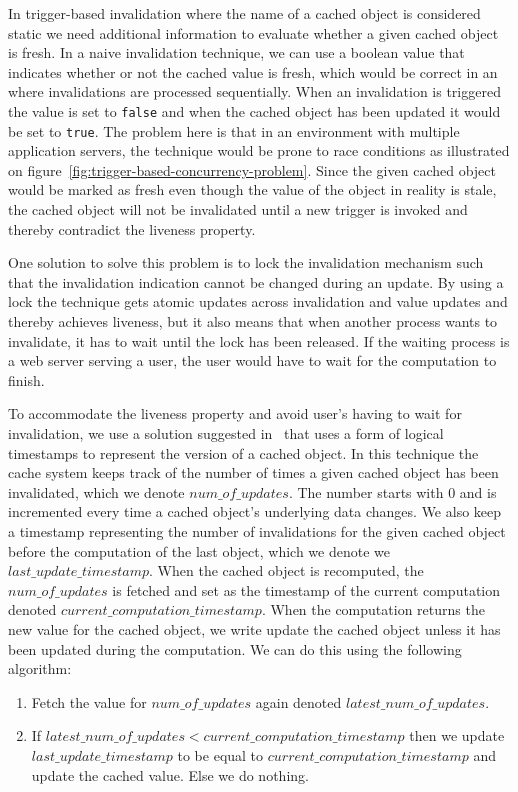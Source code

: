 In trigger-based invalidation where the name of a cached object is considered static we need additional information to evaluate whether a given cached object is fresh. In a naive invalidation technique, we can use a boolean value that indicates whether or not the cached value is fresh, which would be correct in an where invalidations are processed sequentially. When an invalidation is triggered the value is set to \verb$false$ and when the cached object has been updated it would be set to \verb$true$. The problem here is that in an environment with multiple application servers, the technique would be prone to race conditions as illustrated on figure~\ref{fig:trigger-based-concurrency-problem}. Since the given cached object would be marked as fresh even though the value of the object in reality is stale, the cached object will not be invalidated until a new trigger is invoked and thereby contradict the liveness property.

One solution to solve this problem is to lock the invalidation mechanism such that the invalidation indication cannot be changed during an update. By using a lock the technique gets atomic updates across invalidation and value updates and thereby achieves liveness, but it also means that when another process wants to invalidate, it has to wait until the lock has been released. If the waiting process is a web server serving a user, the user would have to wait for the computation to finish.

To accommodate the liveness property and avoid user's having to wait for invalidation, we use a solution suggested in~\cite{paper:ibm-extended} that uses a form of logical timestamps to represent the version of a cached object. In this technique the cache system keeps track of the number of times a given cached object has been invalidated, which we denote $num\_of\_updates$. The number starts with $0$ and is incremented every time a cached object's underlying data changes.
We also keep a timestamp representing the number of invalidations for the given cached object before the computation of the last object, which we denote we $last\_update\_timestamp$. When the cached object is recomputed, the $num\_of\_updates$ is fetched and set as the timestamp of the current computation denoted $current\_computation\_timestamp$. When the computation returns the new value for the cached object, we write update the cached object unless it has been updated during the computation. We can do this using the following algorithm:

\begin{enumerate}
  \item Fetch the value for $num\_of\_updates$ again denoted $latest\_num\_of\_updates$.
  \item If $latest\_num\_of\_updates < current\_computation\_timestamp$ then we update $last\_update\_timestamp$ to be equal to $current\_computation\_timestamp$ and update the cached value. Else we do nothing.
\end{enumerate}

